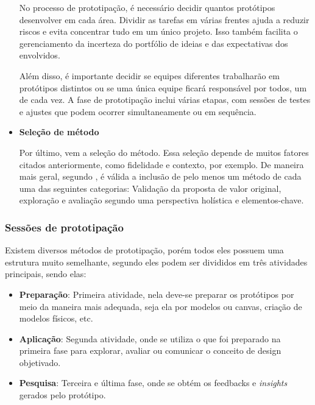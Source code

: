\begin{itemize}
No processo de prototipação, é necessário decidir quantos protótipos desenvolver em cada área. Dividir as tarefas em várias frentes ajuda a reduzir riscos e evita concentrar tudo em um único projeto. Isso também facilita o gerenciamento da incerteza do portfólio de ideias e das expectativas dos envolvidos.

Além disso, é importante decidir se equipes diferentes trabalharão em protótipos distintos ou se uma única equipe ficará responsável por todos, um de cada vez. A fase de prototipação inclui várias etapas, com sessões de testes e ajustes que podem ocorrer simultaneamente ou em sequência.

\item \textbf{Seleção de método}

Por último, vem a seleção do método. Essa seleção depende de muitos fatores citados anteriormente, como fidelidade e contexto, por exemplo. De maneira mais geral, segundo \cite{Stickdorn2019}, é válida a inclusão de pelo menos um método de cada uma das seguintes categorias: Validação da proposta de valor original, exploração e avaliação segundo uma perspectiva holística e elementos-chave.	
	
\end{itemize}

\subsubsection{Sessões de prototipação}

Existem diversos métodos de prototipação, porém todos eles possuem uma estrutura muito semelhante, segundo \cite{Stickdorn2019} eles podem ser divididos em três atividades principais, sendo elas:

\begin{itemize}
	\item \textbf{Preparação}: Primeira atividade, nela deve-se preparar os protótipos por meio da maneira mais adequada, seja ela por modelos ou canvas, criação de modelos físicos, etc.
	
	\item \textbf{Aplicação}: Segunda atividade, onde se utiliza o que foi preparado na primeira fase para explorar, avaliar ou comunicar o conceito de design objetivado.
	
	\item \textbf{Pesquisa}: Terceira e última fase, onde se obtém os feedbacks e \textit{insights} gerados pelo protótipo.
\end{itemize}

